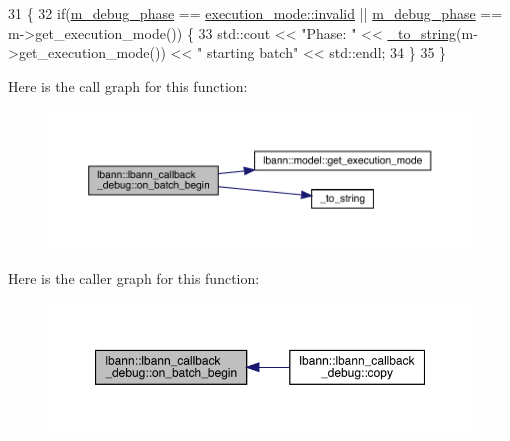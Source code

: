 \begin{DoxyCode}
31                                                        \{
32   \textcolor{keywordflow}{if}(\hyperlink{classlbann_1_1lbann__callback__debug_acc66ab699534e42aa958148f1fb3fd6f}{m\_debug\_phase} == \hyperlink{base_8hpp_a2781a159088df64ed7d47cc91c4dc0a8afedb2d84cafe20862cb4399751a8a7e3}{execution\_mode::invalid} || 
      \hyperlink{classlbann_1_1lbann__callback__debug_acc66ab699534e42aa958148f1fb3fd6f}{m\_debug\_phase} == m->get\_execution\_mode()) \{
33     std::cout << \textcolor{stringliteral}{"Phase: "} << \hyperlink{base_8hpp_adeeaddd10bd31df0cae7cb0fcae45d5c}{\_to\_string}(m->get\_execution\_mode()) << \textcolor{stringliteral}{" starting batch"} << 
      std::endl;
34   \}
35 \}
\end{DoxyCode}
Here is the call graph for this function\+:\nopagebreak
\begin{figure}[H]
\begin{center}
\leavevmode
\includegraphics[width=350pt]{classlbann_1_1lbann__callback__debug_abab8f3b9c1db3d0ef3a715afc7b880db_cgraph}
\end{center}
\end{figure}
Here is the caller graph for this function\+:\nopagebreak
\begin{figure}[H]
\begin{center}
\leavevmode
\includegraphics[width=350pt]{classlbann_1_1lbann__callback__debug_abab8f3b9c1db3d0ef3a715afc7b880db_icgraph}
\end{center}
\end{figure}
\mbox{\label{classlbann_1_1lbann__callback__debug_ac364fb6e77dc163e146af77bb670d74b}} 
